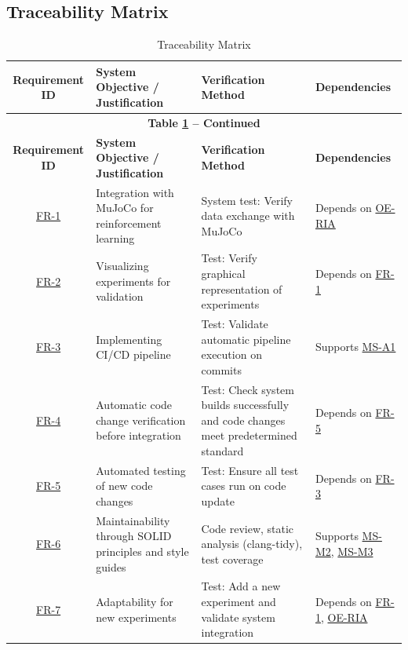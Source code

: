 \documentclass[12pt]{article}
\begin{document}
\begin{landscape}
\section{Traceability Matrix}
  \begin{longtable}{|c|p{6cm}|p{5cm}|p{4cm}|}
    \caption{Traceability Matrix} \label{tab:traceability_matrix} \\
    \hline
    \textbf{Requirement ID} & \textbf{System Objective / Justification} & \textbf{Verification Method} & \textbf{Dependencies} \\
    \hline
    \endfirsthead
    \multicolumn{4}{c}{\textbf{Table \ref{tab:traceability_matrix} -- Continued}}\\[0.5ex]
    \hline
    \textbf{Requirement ID} & \textbf{System Objective / Justification} & \textbf{Verification Method} & \textbf{Dependencies} \\
    \hline
    \endhead
    \hyperref[FR-1]{FR-1} & Integration with MuJoCo for reinforcement learning & System test: Verify data exchange with MuJoCo & Depends on \hyperref[OE-RIA]{OE-RIA} \\
    \hline
    \hyperref[FR-2]{FR-2} & Visualizing experiments for validation & Test: Verify graphical representation of experiments & Depends on \hyperref[FR-1]{FR-1} \\
    \hline
    \hyperref[FR-3]{FR-3} & Implementing CI/CD pipeline & Test: Validate automatic pipeline execution on commits & Supports \hyperref[MS-A1]{MS-A1} \\
    \hline
    \hyperref[FR-4]{FR-4} & Automatic code change verification before integration & Test: Check system builds successfully and code changes meet predetermined standard & Depends on \hyperref[FR-5]{FR-5} \\
    \hline
    \hyperref[FR-5]{FR-5} & Automated testing of new code changes & Test: Ensure all test cases run on code update & Depends on \hyperref[FR-3]{FR-3} \\
    \hline
    \hyperref[FR-6]{FR-6} & Maintainability through SOLID principles and style guides & Code review, static analysis (clang-tidy), test coverage & Supports \hyperref[MS-M2]{MS-M2}, \hyperref[MS-M3]{MS-M3} \\
    \hline
    \hyperref[FR-7]{FR-7} & Adaptability for new experiments & Test: Add a new experiment and validate system integration & Depends on \hyperref[FR-1]{FR-1}, \hyperref[OE-RIA]{OE-RIA} \\

\end{longtable}
\end{landscape}
\end{document}
